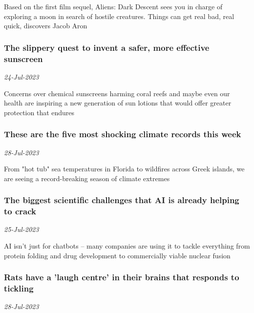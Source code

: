 Based on the first film sequel, Aliens: Dark Descent sees you in charge of exploring a moon in search of hostile creatures. Things can get real bad, real quick, discovers Jacob Aron
\subsubsection{The slippery quest to invent a safer, more effective sunscreen \href{https://www.newscientist.com/article/mg25934491-500-the-slippery-quest-to-invent-a-safer-more-effective-sunscreen/?utm_campaign=RSS%7CNSNS&utm_source=NSNS&utm_medium=RSS&utm_content=home}{\ding{225}}}
\textit{24-Jul-2023}

Concerns over chemical sunscreens harming coral reefs and maybe even our health are inspiring a new generation of sun lotions that would offer greater protection that endures
\subsubsection{These are the five most shocking climate records this week \href{https://www.newscientist.com/article/2384931-these-are-the-five-most-shocking-climate-records-this-week/?utm_campaign=RSS%7CNSNS&utm_source=NSNS&utm_medium=RSS&utm_content=home}{}}
\textit{28-Jul-2023}

From "hot tub" sea temperatures in Florida to wildfires across Greek islands, we are seeing a record-breaking season of climate extremes
\subsubsection{The biggest scientific challenges that AI is already helping to crack \href{https://www.newscientist.com/article/2384085-the-biggest-scientific-challenges-that-ai-is-already-helping-to-crack/?utm_campaign=RSS%7CNSNS&utm_source=NSNS&utm_medium=RSS&utm_content=home}{\ding{225}}}
\textit{25-Jul-2023}

AI isn't just for chatbots – many companies are using it to tackle everything from protein folding and drug development to commercially viable nuclear fusion
\subsubsection{Rats have a 'laugh centre' in their brains that responds to tickling \href{https://www.newscientist.com/article/2385124-rats-have-a-laugh-centre-in-their-brains-that-responds-to-tickling/?utm_campaign=RSS%7CNSNS&utm_source=NSNS&utm_medium=RSS&utm_content=home}{}}
\textit{28-Jul-2023}


